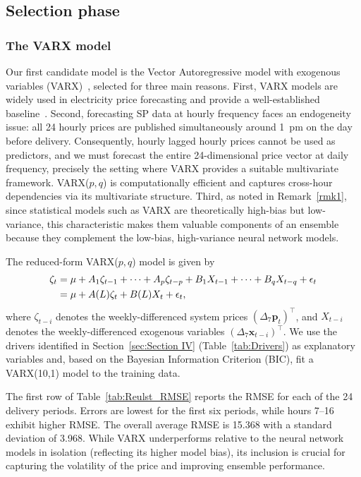 \documentclass{article}
\begin{document}
\subsection{Selection phase}
\subsubsection{The VARX model} \label{subsub1}

Our first candidate model is the Vector Autoregressive model with exogenous variables (VARX)~\cite{lutkepohl2005new}, selected for three main reasons. First, VARX models are widely used in electricity price forecasting and provide a well-established baseline~\cite{marcjasz2018selection,lehna2022forecasting}. Second, forecasting SP data at hourly frequency faces an endogeneity issue: all 24 hourly prices are published simultaneously around 1~pm on the day before delivery. Consequently, hourly lagged hourly prices cannot be used as predictors, and we must forecast the entire 24-dimensional price vector at daily frequency, precisely the setting where VARX provides a suitable multivariate framework. VARX($p,q$) is computationally efficient and captures cross-hour dependencies via its multivariate structure. Third, as noted in Remark~\ref{rmk1}, since statistical models such as VARX are theoretically high-bias but low-variance, this characteristic makes them valuable components of an ensemble because they complement the low-bias, high-variance neural network models.

The reduced-form VARX($p,q$) model is given by
\begin{align}
\zeta_t & = \mu + A_1\zeta_{t-1}+\dots+A_p\zeta_{t-p}+B_1X_{t-1}+\dots+B_qX_{t-q} + \epsilon_t \notag\\
  & = \mu + A(L)\zeta_t + B(L)X_t + \epsilon_t,
\end{align}
where $\zeta_{t-i}$ denotes the weekly-differenced system prices $(\Delta_7 \textbf{p}_t)^\top$, and $X_{t-i}$ denotes the weekly-differenced exogenous variables $(\Delta_7 \textbf{x}_{t-i})^\top$. We use the drivers identified in Section~\ref{sec:Section IV} (Table~\ref{tab:Drivers}) as explanatory variables and, based on the Bayesian Information Criterion (BIC), fit a VARX(10,1) model to the training data.

The first row of Table~\ref{tab:Reulst_RMSE} reports the RMSE for each of the 24 delivery periods. Errors are lowest for the first six periods, while hours 7–16 exhibit higher RMSE. The overall average RMSE is 15.368 with a standard deviation of 3.968. While VARX underperforms relative to the neural network models in isolation (reflecting its higher model bias), its inclusion is crucial for capturing the volatility of the price and improving ensemble performance.
\end{document}
